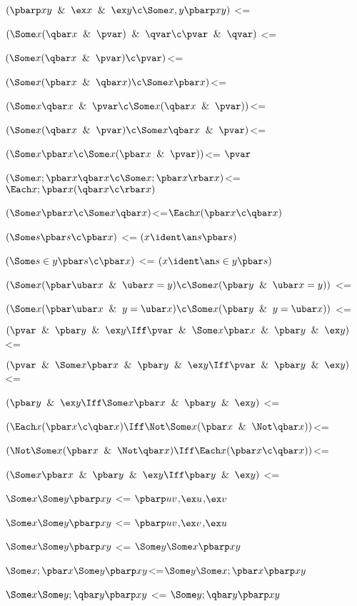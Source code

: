 $(\pbarp xy \And \ex x \And \ex y\c \Some x,y \pbarp xy)$ <= 

$(\Some x (\qbar x \And \pvar) \And \qvar \c \pvar \And \qvar)$ <=

$(\Some x (\qbar x \And \pvar) \c \pvar)$<=

$(\Some x (\pbar x \And \qbar x) \c \Some x \pbar x )$<=

$(\Some x \qbar x \And \pvar\c \Some x (\qbar x \And \pvar))$<=

$(\Some x(\qbar x \And \pvar)\c \Some x \qbar x \And \pvar )$<=

$(\Some x\pbar x \c\Some x(\pbar x \And\pvar))$<= $\pvar$

$(\Some x;\pbar x \qbar x \c \Some x ;\pbar x \rbar x)$<= $\Each x ; \pbar x (\qbar x \c \rbar x)$ 

$(\Some x \pbar x \c \Some x \qbar x)$<=$\Each x(\pbar x \c \qbar x)$

$(\Some s \pbar s \c \pbar x)$ <= $(x \ident \an s \pbar s)$

$(\Some s \in y \pbar s \c \pbar x)$ <= $(x \ident \an s \in y \pbar s)$

$(\Some x(\pbar \ubar x \And \ubar x = y)\c\Some x(\pbar y \And \ubar x = y))$ <= 

$(\Some x(\pbar \ubar x \And y = \ubar x)\c\Some x(\pbar y \And  y = \ubar x ))$ <= 

$(\pvar \And \pbar y \And \ex y \Iff\pvar \And \Some x\pbar x\And \pbar y \And \ex y)$ <=

$( \pvar \And \Some x\pbar x\And \pbar y \And \ex y \Iff \pvar \And \pbar y \And \ex y )$ <=

$(\pbar y \And \ex y \Iff \Some x\pbar x\And \pbar y \And \ex y)$ <=

$(\Each x(\pbar x \c \qbar x) \Iff \Not \Some x(\pbar x \And \Not \qbar x))$<=

$(\Not \Some x(\pbar x \And \Not \qbar x) \Iff \Each x(\pbar x \c \qbar x))$<=

$(\Some x\pbar x\And \pbar y \And \ex y \Iff  \pbar y \And \ex y )$ <=

$\Some x \Some y \pbarp xy$ <= $ \pbarp uv$,$\ex u$,$\ex v$

$\Some x \Some y \pbarp xy$ <= $ \pbarp uv$,$\ex v$,$\ex u$

$\Some x \Some y \pbarp xy$ <= $ \Some y \Some x \pbarp xy$

$\Some x;\pbar x \Some y \pbarp xy$<=$\Some y \Some x;\pbar x\pbarp xy$ 

$\Some x \Some y; \qbar y \pbarp xy$ <= $\Some y; \qbar y\pbarp xy$ 

